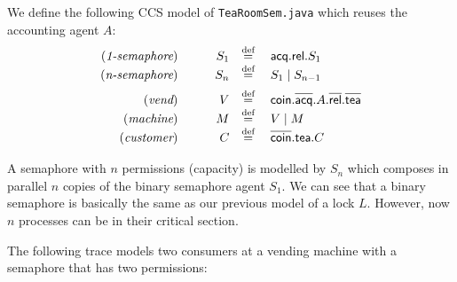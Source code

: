 \documentclass{article}
\def\mystrut{\rule{0pt}{0.68em}}
\newcommand{\act}[1]{\textsf{#1}}
\newcommand{\da}[1]{\overline{\mystrut\textsf{#1}}}
\newcommand{\defn}{\stackrel{\text{def}}{=}}
\newcommand{\dak}[1]{\overline{\textsf{#1}}}
\newcommand{\op}[2]{\act{r}(#1).\dak{w}(#1 #2)}
\newcommand{\highlight}[1]{%
  \colorbox{yellow!50}{$\displaystyle#1$}}
\newcommand{\highlightG}[1]{%
  \colorbox{blue!30}{$\displaystyle#1$}}
\newcommand{\highlightR}[1]{%
  \colorbox{red!25}{$\displaystyle#1$}}
\newcommand{\highlightGH}[1]{%
  \colorbox{blue!5}{$\displaystyle#1$}}
\theoremstyle{definition}
\newcommand{\src}[1]{\highlightR{#1}}
\newcommand{\srch}[1]{\highlightG{#1}}
\newcommand{\trgh}[1]{\highlightGH{#1}}
\newcommand{\subd}[1]{\highlight{#1}}
\begin{document}
%
\noindent
We define the following CCS model of \texttt{TeaRoomSem.java} which reuses
the accounting agent $A$:
%
\setlength{\arraycolsep}{0.2em}
\begin{align*}
\begin{array}{rrcl}
(\textit{1-semaphore})\qquad & S_1 & \defn{} & \act{acq}.\act{rel}.S_1 \\
(\textit{n-semaphore})\qquad & S_n & \defn{} & S_1 \mid S_{n-1} \\[0.5em]
(\textit{vend})\qquad & V & \defn{} & \act{coin}.\da{acq}.A.\da{rel}.\da{tea} \\
(\textit{machine})\qquad & M & \defn{} & V \mid M \\
(\textit{customer})\qquad & C & \defn{} & \da{coin}.\act{tea}.C \\
\end{array}
\end{align*}

\noindent
A semaphore with $n$ permissions (capacity) is modelled by $S_n$ which
composes in parallel $n$ copies of the binary semaphore agent
$S_1$. We can see that a binary semaphore is basically the same as our
previous model of a lock $L$.  However, now $n$ processes can be
in their critical section.

The following trace models two consumers at a vending machine
with a semaphore that has two permissions:
%
\end{document}
